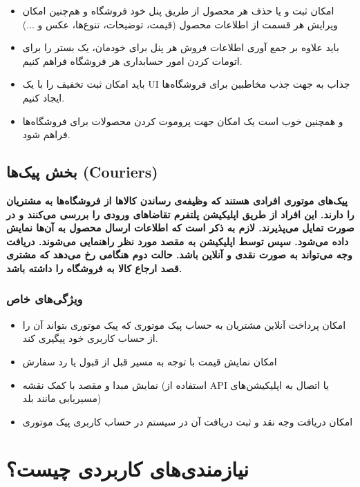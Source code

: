 \documentclass[]{article}
\begin{document}
\begin{itemize}
\item
  امکان ثبت و یا حذف هر محصول از طریق پنل خود فروشگاه و هم‌چنین امکان
  ویرایش هر قسمت از اطلاعات محصول (قیمت، توضیحات، تنوع‌ها، عکس و ...)
\item
  باید علاوه بر جمع آوری اطلاعات فروش هر پنل برای خودمان، یک بستر را
  برای اتومات کردن امور حسابداری هر فروشگاه فراهم کنیم.
\item
  باید امکان ثبت تخفیف را با یک UI جذاب به جهت جذب مخاطبین برای
  فروشگاه‌ها ایجاد کنیم.
\item
  و همچنین خوب است یک امکان جهت پروموت کردن محصولات برای فروشگاه‌ها
  فراهم شود.
\end{itemize}

\subsection{بخش پیک‌ها
(Couriers)}\label{ux628ux62eux634-ux67eux6ccux6a9ux647ux627-couriers-1}

\textbf{پیک‌های موتوری افرادی هستند که وظیفه‌ی رساندن کالاها از
فروشگاه‌ها به مشتریان را دارند. این افراد از طریق اپلیکیشن پلتفرم
تقاضاهای ورودی را بررسی می‌کنند و در صورت تمایل می‌پذیرند. لازم به ذکر
است که اطلاعات ارسال محصول به آن‌ها نمایش داده می‌شود. سپس توسط اپلیکیشن
به مقصد مورد نظر راهنمایی می‌شوند. دریافت وجه می‌تواند به صورت نقدی و
آنلاین باشد. حالت دوم هنگامی رخ می‌دهد که مشتری قصد ارجاع کالا به
فروشگاه را داشته باشد.}

\subsubsection{ویژگی‌های
خاص}\label{ux648ux6ccux698ux6afux6ccux647ux627ux6cc-ux62eux627ux635-2}

\begin{itemize}
\item
  امکان پرداخت آنلاین مشتریان به حساب پیک موتوری که پیک موتوری بتواند آن
  را از حساب کاربری خود پیگیری کند.
\item
  امکان نمایش قیمت با توجه به مسیر قبل از قبول یا رد سفارش
\item
  نمایش مبدا و مقصد با کمک نقشه‌ (استفاده از API یا اتصال به
  اپلیکیشن‌های مسیریابی مانند بلد)
\item
  امکان دریافت وجه نقد و ثبت دریافت آن در سیستم در حساب کاربری پیک
  موتوری
\end{itemize}

\section{نیازمندی‌های کاربردی
چیست؟}\label{ux646ux6ccux627ux632ux645ux646ux62fux6ccux647ux627ux6cc-ux6a9ux627ux631ux628ux631ux62fux6cc-ux686ux6ccux633ux62a}
\end{document}
